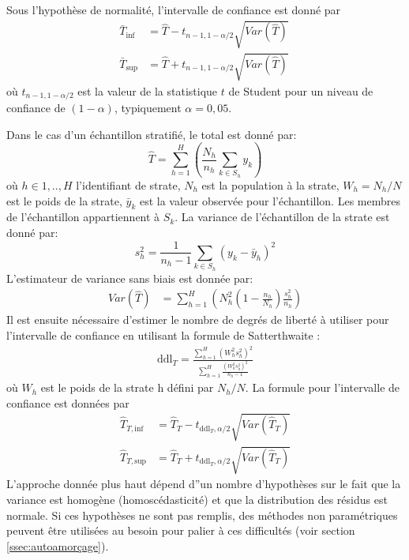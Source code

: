             Sous l'hypothèse de normalité, l'intervalle de confiance est donné par
            \begin{align}
                \bar{T}_{\text{inf}} &= \hat{T} - t_{n-1, 1-\alpha/2} \sqrt{Var(\hat{T})} \\
                \bar{T}_{\text{sup}} &= \hat{T} + t_{n-1, 1-\alpha/2} \sqrt{Var(\hat{T})} \
            \end{align}
            où $t_{n-1, 1-\alpha/2}$ est la valeur de la statistique $t$ de Student pour un niveau de confiance de $(1-\alpha)$, typiquement $\alpha = 0{,}05$. \par
            Dans le cas d'un échantillon stratifié, le total est donné par:
            \begin{equation}
                \hat{T} =\sum_{h=1}^H \left( \frac{N_h}{n_h}\sum_{k\in S_h}y_k\right)
            \end{equation}
            où  $h \in {1,..,H}$ l'identifiant de strate, $N_h$ est la population à la strate, $W_h = N_h/N$ est le poids de la strate, $\bar{y}_k$ est la valeur observée pour l'échantillon. Les membres de l'échantillon appartiennent à $S_k$. La variance de l'échantillon de la strate est donné par:
            \begin{equation}
                s_h^2 = \frac{1}{n_h-1} \sum_{k \in S_h} (y_k - \bar{y}_h)^2
            \end{equation}
            L'estimateur de variance sans biais est donnée par:
            \begin{align}
                Var(\hat{T}) &= \sum_{h=1}^H \left( N_h^2 \left(1 - \frac{n_h}{N_h}\right)\frac{s_h^2}{n_h}\right)
            \end{align}
            Il est ensuite nécessaire d'estimer le nombre de degrés de liberté à utiliser pour l'intervalle de confiance en utilisant la formule de Satterthwaite \parencite{satterthwaite_approximate_1946}:
            \begin{align}
                \text{ddl}_T = \frac{\sum_{h=1}^H \left(W_h^2 s_{h}^2\right)^2}{\sum_{h=1}^H\frac{\left(W_h^2 s_{h}^2\right)^2}{n_h-1}}
            \end{align}
            où $W_h$ est le poids de la strate h défini par $N_h/N$.
            La formule pour l'intervalle de confiance est données par 
            \begin{align}
                \hat{T}_{T,\text{inf}} &= \hat{T}_T - t_{\text{ddl}_T,\alpha/2}\sqrt{Var(\hat{T}_T)} \\
                \hat{T}_{T,\text{sup}} &= \hat{T}_T+ t_{\text{ddl}_T,\alpha/2}\sqrt{Var(\hat{T}_T)} 
            \end{align}
            L'approche donnée plus haut dépend d''un nombre d'hypothèses sur le fait que la variance est homogène (homoscédasticité) et que la distribution des résidus est normale. Si ces hypothèses ne sont pas remplis, des méthodes non paramétriques peuvent être utilisées au besoin pour palier à ces difficultés (voir section \ref{ssec:autoamorçage}).
